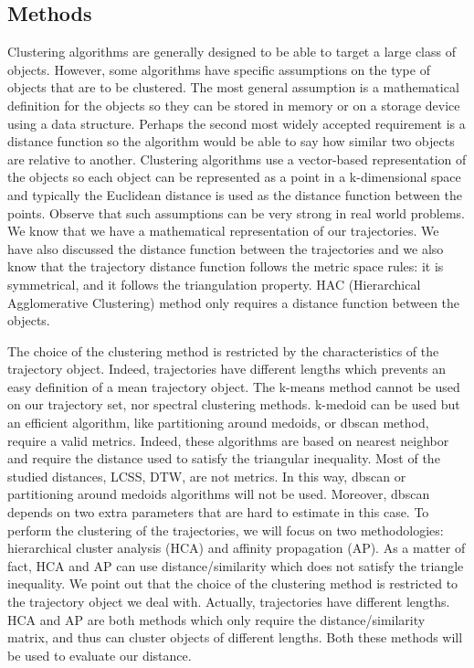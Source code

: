 \documentclass[a4paper, 12pt]{article}
\begin{document}
\subsection{Methods}
Clustering algorithms are generally designed to be able to target a large class of objects. However, some algorithms have specific assumptions on the type of objects that are to be clustered. The most general assumption is a mathematical definition for the objects so they can be stored in memory or on a storage device using a data structure. Perhaps the second most widely accepted requirement is a distance function so the algorithm would be able to say how similar two objects are relative to another. Clustering algorithms use a vector-based representation of the objects so each object can be represented as a point in a k-dimensional space and typically the Euclidean distance is used as the distance function between the points. Observe that such assumptions can be very strong in real world problems. We know that we have a mathematical representation of our trajectories. We have also discussed the distance function between the trajectories and we also know that the trajectory distance function follows the metric space rules: it is symmetrical, and it follows the triangulation property. HAC (Hierarchical Agglomerative Clustering) method only requires a distance function between the objects.

The choice of the clustering method is restricted by the characteristics of the trajectory object. Indeed, trajectories have different lengths which prevents an easy definition of a mean trajectory object. The k-means method cannot be used on our trajectory set, nor spectral clustering methods. k-medoid can be used but an efficient algorithm, like partitioning around medoids, or dbscan method, require a valid metrics. Indeed, these algorithms are based on nearest neighbor and require the distance used to satisfy the triangular inequality. Most of the studied distances, LCSS, DTW, are not metrics. In this way, dbscan or partitioning around medoids algorithms will not be used. Moreover, dbscan depends on two extra parameters that are hard to estimate in this case. To perform the clustering of the trajectories, we will focus on two methodologies: hierarchical cluster analysis (HCA) and affinity propagation (AP). As a matter of fact, HCA and AP can use distance/similarity which does not satisfy the triangle inequality. We point out that the choice of the clustering method is restricted to the trajectory object we deal with. Actually, trajectories have different lengths. HCA and AP are both methods which only require the distance/similarity matrix, and thus can cluster objects of different lengths. Both these methods will be used to evaluate our distance.
\end{document}

